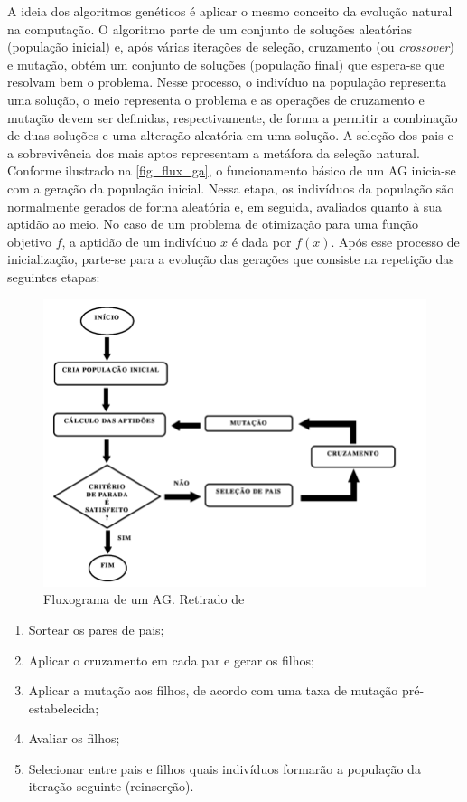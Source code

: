 A ideia dos algoritmos genéticos é aplicar o mesmo conceito da evolução natural na computação. O algoritmo parte de um conjunto de soluções aleatórias (população inicial) e, após várias iterações de seleção, cruzamento (ou \textit{crossover}) e mutação, obtém um conjunto de soluções (população final) que espera-se que resolvam bem o problema. Nesse processo, o indivíduo na população representa uma solução, o meio representa o problema e as operações de cruzamento e mutação devem ser definidas, respectivamente, de forma a permitir a combinação de duas soluções e uma alteração aleatória em uma solução. A seleção dos pais e a sobrevivência dos mais aptos representam a metáfora da seleção natural. 
\\
Conforme ilustrado na \autoref{fig_flux_ga}, o funcionamento básico de um AG inicia-se com a geração da população inicial. Nessa etapa, os indivíduos da população são normalmente gerados de forma aleatória e, em seguida, avaliados quanto à sua aptidão ao meio. No caso de um problema de otimização para uma função objetivo $f$, a aptidão de um indivíduo $x$ é dada por $f(x)$. Após esse processo de inicialização, parte-se para a evolução das gerações que consiste na repetição das seguintes etapas:

\begin{figure}[!htbp]
	\centering
	\includegraphics[width=1\textwidth]{cap_otimizacao-bio/figs/ga-flux.png}
	\caption{\label{fig_flux_ga}Fluxograma de um AG. Retirado de \cite{FiguraGA}}
\end{figure}

\begin{enumerate}  
	\item Sortear os pares de pais; 
	\item Aplicar o cruzamento em cada par e gerar os filhos; 
	\item Aplicar a mutação aos filhos, de acordo com uma taxa de mutação pré-estabelecida;
	\item Avaliar os filhos;
	\item Selecionar entre pais e filhos quais indivíduos formarão a população da iteração seguinte (reinserção).
\end{enumerate}

